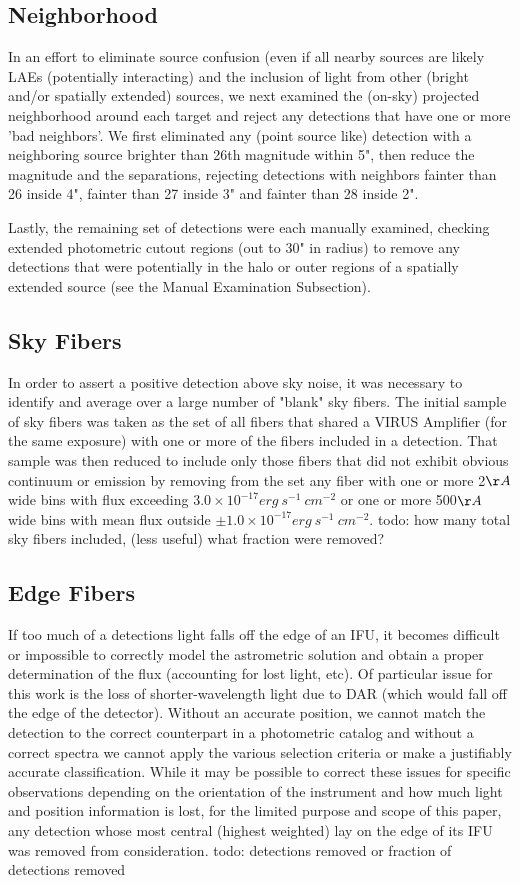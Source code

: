 \documentclass{aastex62}
\begin{document}
\subsection{Neighborhood}
In an effort to eliminate source confusion (even if all nearby sources are likely LAEs (potentially interacting) and the inclusion of light from other (bright and/or spatially extended) sources, we next examined the (on-sky) projected neighborhood around each target and reject any detections that have one or more 'bad neighbors'. We first eliminated any (point source like) detection with a neighboring source brighter than 26th magnitude within 5", then reduce the magnitude and the separations, rejecting detections with neighbors fainter than 26 inside 4", fainter than 27 inside 3" and fainter than 28 inside 2". 

Lastly, the remaining set of detections were each manually examined, checking extended photometric cutout regions (out to 30" in radius) to remove any detections that were potentially in the halo or outer regions of a spatially extended source (see the Manual Examination Subsection).


\subsection{Sky Fibers}
In order to assert a positive detection above sky noise, it was necessary to identify and average over a large number of "blank" sky fibers. The initial sample of sky fibers was taken as the set of all fibers that shared a VIRUS Amplifier (for the same exposure) with one or more of the fibers included in a detection. That sample was then reduced to include only those fibers that did not exhibit obvious continuum or emission by removing from the set any fiber with one or more 2$\AA$ wide bins with flux exceeding $3.0\times 10^{-17} erg\ s^{-1}\ cm^{-2}$ or one or more 500$\AA$ wide bins with mean flux outside $\pm 1.0 \times 10^{-17} erg\ s^{-1}\ cm^{-2}$.    { \color{red} todo: how many total sky fibers included, (less useful) what fraction were removed?}
 
\subsection{Edge Fibers}
If too much of a detections light falls off the edge of an IFU, it becomes difficult or impossible to correctly model the astrometric solution and obtain a proper determination of the flux (accounting for lost light, etc). Of particular issue for this work is the loss of shorter-wavelength light due to DAR (which would fall off the edge of the detector). Without an accurate position, we cannot match the detection to the correct counterpart in a photometric catalog and without a correct spectra we cannot apply the various selection criteria or make a justifiably accurate classification. While it may be possible to correct these issues for specific observations depending on the orientation of the instrument and how much light and position information is lost, for the limited purpose and scope of this paper, any detection whose most central (highest weighted) lay on the edge of its IFU was removed from consideration.  { \color{red} todo: detections removed or fraction of detections removed}
\end{document}

